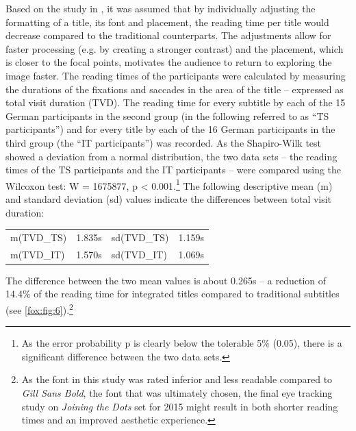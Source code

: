 \documentclass[output=paper]{langsci/langscibook}
\begin{document}
Based on the study in \citet{fox2012}, it was assumed that by individually adjusting the formatting of a title, its font and placement, the reading time per title would decrease compared to the traditional counterparts. The adjustments allow for faster processing (e.g. by creating a stronger contrast) and the placement, which is closer to the focal points, motivates the audience to return to exploring the image faster. The reading times of the participants were calculated by measuring the durations of the fixations and saccades in the area of the title – expressed as total visit duration (TVD). The reading time for every subtitle by each of the 15 German participants in the second group (in the following referred to as “TS participants”) and for every title by each of the 16 German participants in the third group (the “IT participants”) was recorded. As the Shapiro-Wilk test showed a deviation from a normal distribution, the two data sets – the reading times of the TS participants and the IT participants – were compared using the Wilcoxon test: W = 1675877, p {\textless} 0.001.\footnote{As the error probability p is clearly below the tolerable 5\% (0.05), there is a significant difference between the two data sets.} The following descriptive mean (m) and standard deviation (sd) values indicate the differences between total visit duration:

\ea
\begin{tabular}{l@{=}rl@{=}r}

m(TVD\_TS) & 1.835s & sd(TVD\_TS) & 1.159s\\

m(TVD\_IT) & 1.570s & sd(TVD\_IT) & 1.069s
\end{tabular}
\z



The difference between the two mean values is about 0.265s – a reduction of 14.4\% of the reading time for integrated titles compared to traditional subtitles (see \ref{fox:fig:6}).\footnote{As the font in this study was rated inferior and less readable compared to \textit{Gill Sans Bold}, the font that was ultimately chosen, the final eye tracking study on \textit{Joining the Dots} set for 2015 might result in both shorter reading times and an improved aesthetic experience.}
\end{document}
